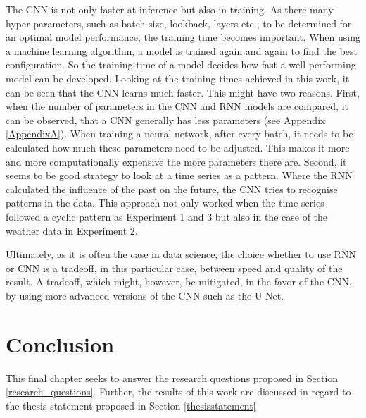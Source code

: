The CNN is not only faster at inference but also in training. As there many hyper-parameters, such as batch size, lookback, layers etc., to be determined for an optimal model performance, the training time becomes important. When using a machine learning algorithm, a model is trained again and again to find the best configuration. So the training time of a model decides how fast a well performing model can be developed. Looking at the training times achieved in this work, it can be seen that the CNN learns much faster. This might have two reasons. First, when the number of parameters in the CNN and RNN models are compared, it can be observed, that a CNN generally has less parameters (see Appendix \ref{AppendixA}). When training a neural network, after every batch, it needs to be calculated how much these parameters need to be adjusted. This makes it more and more computationally expensive the more parameters there are. Second, it seems to be good strategy to look at a time series as a pattern. Where the RNN calculated the influence of the past on the future, the CNN tries to recognise patterns in the data. This approach not only worked when the time series followed a cyclic pattern as Experiment 1 and 3 but also in the case of the weather data in Experiment 2.     

Ultimately, as it is often the case in data science, the choice whether to use RNN or CNN is a tradeoff, in this particular case, between speed and quality of the result. A tradeoff, which might, however, be mitigated, in the favor of the CNN, by using more advanced versions of the CNN such as the U-Net.





\chapter{Conclusion}

This final chapter seeks to answer the research questions proposed in Section \ref{research_questions}. Further, the results of this work are discussed in regard to the thesis statement proposed in Section \ref{thesisstatement}

